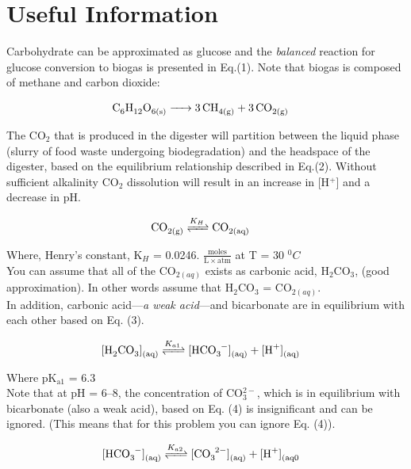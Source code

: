\documentclass[11pt,letterpaper]{article}
\begin{document}
\section *{Useful Information}
Carbohydrate can be approximated as glucose and the \emph{balanced} reaction for glucose conversion to biogas is presented in Eq.(1).  Note that biogas is composed of methane and carbon dioxide:

\begin{align}
\cee{C_6H_{12}O_{6(s)}  &-> 3CH_{4(g)} + 3CO_{2(g)}}
\end{align}

The CO$_2$ that is produced in the digester will partition between the liquid phase (slurry of food waste undergoing biodegradation) and the headspace of the digester, based on the equilibrium relationship described in Eq.(2). Without sufficient alkalinity CO$_2$ dissolution  will result in an increase in [H$^+$] and a decrease in pH.

\begin{align}
\cee{CO_{2(g)} &<=>[K_H] CO_{2(aq)}}
\end{align}

Where, Henry's constant, K$_H$ = 0.0246. $\mathrm{\frac{moles}{L\times atm}}$ at T = 30 $^0C$ \\

You can assume that all of the CO$_{2(aq)}$ exists as carbonic acid, H$_2$CO$_3$, (good approximation).  In other words assume that H$_2$CO$_3$ = CO$_{2(aq)}$.\\  

In addition, carbonic acid---\emph{a weak acid}---and bicarbonate are in equilibrium with each other based on Eq. (3).

\pagebreak 

\begin{align}
\cee{[H_2CO_3]_{(aq)} &<=>[K_{a1}] [HCO_3^{-}]_{(aq)} + [H^+]_{(aq)}}
\end{align}

Where pK$\mathrm{_{a1}}$ = 6.3\\

Note that at pH = 6--8, the concentration of CO$_3^{2-}$, which is in equilibrium with bicarbonate (also a weak acid), based on Eq. (4) is insignificant and can be ignored.  (This means that for this problem you can ignore Eq. (4)).

\begin{align}
\cee{[HCO_3^{-}]_{(aq)} &<=>[K_{a2}] [CO_3^{2-}]_{(aq)} + [H^+]_{(aq0}}
\end{align}
\end{document}
